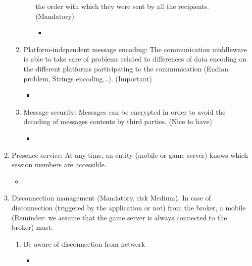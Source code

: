 \begin{enumerate}
\begin{enumerate}
\begin{enumerate}
  the order with which they were sent by all the recipients. (Mandatory)
\label{R_1_d_i}
\begin{itemize}
\item {}
\end{itemize}
\end{enumerate}
\item Platform-independent message encoding: The communication
  middleware is able to take care of problems related to differences
  of data encoding on the different platforms participating to the
  communication (Endian problem, Strings encoding...). (Important)
\label{R_1_e}
\begin{itemize}
\item {}
\end{itemize}
\item Message security: Messages can be
  encrypted in order to avoid the decoding of messages contents by
  third parties. (Nice to have)
\label{R_1_f}
\begin{itemize}
\item {}
\end{itemize}
\end{enumerate}
\item Presence service: At any time, an entity (mobile or game server)
  knows which session members are accessible.
\label{R_2}
\begin{itemize}
\item \postponed
\end{itemize}
\item Disconnection management (Mandatory, risk Medium). In case of
  disconnection (triggered by the application or not) from the broker,
  a mobile (Reminder: we assume that the game server is always
  connected to the broker) must:
\label{R_3}
\begin{enumerate}
\item Be aware of disconnection from network
\label{R_3_a}
\begin{itemize}
\item {}
\end{itemize}
\end{enumerate}
\end{enumerate}
